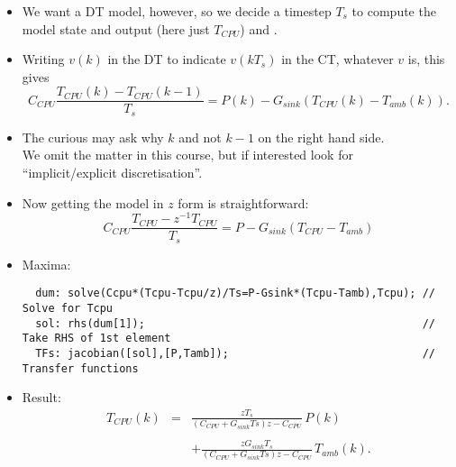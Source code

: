 \begin{frame}
\myPause
 \begin{itemize}[<+-| alert@+>]
 \item We want a DT model, however, so we decide a timestep $T_s$ to compute the model state and output (here
       just $T_{CPU}$) and .
 \item Writing $v(k)$ in the DT to indicate $v(kT_s)$ in the CT, whatever $v$ is, this gives
       \begin{displaymath}
        C_{CPU} \frac{T_{CPU}(k)-T_{CPU}(k-1)}{T_s} = P(k) - G_{sink}(T_{CPU}(k)-T_{amb}(k)).
       \end{displaymath}
 \item The curious may ask why $k$ and not $k-1$ on the right hand side.\\
       We omit the matter in this course, but if interested look for\\
       ``implicit/explicit discretisation''.
 \end{itemize}
\end{frame}

\begin{frame}[fragile]
\myPause
 \begin{itemize}[<+-| alert@+>]
 \item Now getting the model in $z$ form is straightforward:
       \begin{displaymath}
        C_{CPU} \frac{T_{CPU}-z^{-1}T_{CPU}}{T_s} = P - G_{sink}(T_{CPU}-T_{amb})
       \end{displaymath}
 \item Maxima:
       {\scriptsize
       \begin{verbatim}
  dum: solve(Ccpu*(Tcpu-Tcpu/z)/Ts=P-Gsink*(Tcpu-Tamb),Tcpu); // Solve for Tcpu
  sol: rhs(dum[1]);                                           // Take RHS of 1st element
  TFs: jacobian([sol],[P,Tamb]);                              // Transfer functions
       \end{verbatim}
       }
 \item Result:
       \begin{displaymath}
        \begin{array}{rcl}
         T_{CPU}(k) &=&  \frac{zT_s}{(C_{CPU}+G_{sink}Ts)z-C_{CPU}} \, P(k) \\ \\
                    & & +\frac{zG_{sink}T_s}{(C_{CPU}+G_{sink}Ts)z-C_{CPU}} \, T_{amb}(k).
        \end{array}
       \end{displaymath}
 \end{itemize}
\end{frame}

